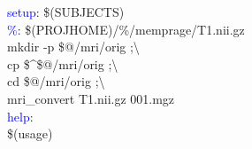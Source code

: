 \documentclass[oneside,11pt]{memoir}
\newcommand{\maker}[2]{\textcolor{blue}{#1}:\enspace#2}
\newcommand{\tab}{\hspace*{4em}}
\begin{document}
	\maker{setup}{ \$(SUBJECTS)} \\
	
	\maker{\%}{  \$(PROJHOME)/\%/memprage/T1.nii.gz } \\
	\tab mkdir -p \$@/mri/orig ;\textbackslash \\
	\tab cp \$\textasciicircum \$@/mri/orig ;\textbackslash \\
	\tab cd \$@/mri/orig ;\textbackslash \\
	\tab mri_convert T1.nii.gz 001.mgz \\
	
	\maker{help}{} \\
	\tab \$(usage) \\
	
	
\end{document}
